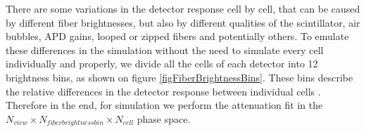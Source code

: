 \documentclass[12pt,a4paper]{article}
\begin{document}
There are some variations in the detector response cell by cell, that can be caused by different fiber brightnesses, but also by different qualities of the scintillator, air bubbles, APD gains, looped or zipped fibers and potentially others. To emulate these differences in the simulation without the need to simulate every cell individually and properly, we divide all the cells of each detector into 12 brightness bins, as shown on figure \ref{figFiberBrightnessBins}. These bins describe the relative differences in the detector response between individual cells \cite{NOVA-doc-34909}. Therefore in the end, for simulation we perform the attenuation fit in the $N_{view}\times N_{fiber brightness bin}\times N_{cell}$ phase space.

\end{document}
